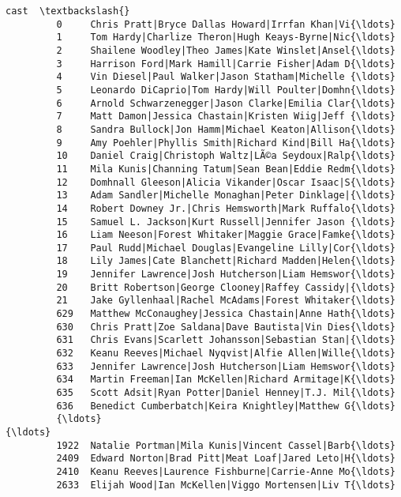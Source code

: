\documentclass[11pt]{article}
\begin{document}
\begin{Verbatim}[commandchars=\\\{\}]
                                                            cast  \textbackslash{}
         0     Chris Pratt|Bryce Dallas Howard|Irrfan Khan|Vi{\ldots}   
         1     Tom Hardy|Charlize Theron|Hugh Keays-Byrne|Nic{\ldots}   
         2     Shailene Woodley|Theo James|Kate Winslet|Ansel{\ldots}   
         3     Harrison Ford|Mark Hamill|Carrie Fisher|Adam D{\ldots}   
         4     Vin Diesel|Paul Walker|Jason Statham|Michelle {\ldots}   
         5     Leonardo DiCaprio|Tom Hardy|Will Poulter|Domhn{\ldots}   
         6     Arnold Schwarzenegger|Jason Clarke|Emilia Clar{\ldots}   
         7     Matt Damon|Jessica Chastain|Kristen Wiig|Jeff {\ldots}   
         8     Sandra Bullock|Jon Hamm|Michael Keaton|Allison{\ldots}   
         9     Amy Poehler|Phyllis Smith|Richard Kind|Bill Ha{\ldots}   
         10    Daniel Craig|Christoph Waltz|LÃ©a Seydoux|Ralp{\ldots}   
         11    Mila Kunis|Channing Tatum|Sean Bean|Eddie Redm{\ldots}   
         12    Domhnall Gleeson|Alicia Vikander|Oscar Isaac|S{\ldots}   
         13    Adam Sandler|Michelle Monaghan|Peter Dinklage|{\ldots}   
         14    Robert Downey Jr.|Chris Hemsworth|Mark Ruffalo{\ldots}   
         15    Samuel L. Jackson|Kurt Russell|Jennifer Jason {\ldots}   
         16    Liam Neeson|Forest Whitaker|Maggie Grace|Famke{\ldots}   
         17    Paul Rudd|Michael Douglas|Evangeline Lilly|Cor{\ldots}   
         18    Lily James|Cate Blanchett|Richard Madden|Helen{\ldots}   
         19    Jennifer Lawrence|Josh Hutcherson|Liam Hemswor{\ldots}   
         20    Britt Robertson|George Clooney|Raffey Cassidy|{\ldots}   
         21    Jake Gyllenhaal|Rachel McAdams|Forest Whitaker{\ldots}   
         629   Matthew McConaughey|Jessica Chastain|Anne Hath{\ldots}   
         630   Chris Pratt|Zoe Saldana|Dave Bautista|Vin Dies{\ldots}   
         631   Chris Evans|Scarlett Johansson|Sebastian Stan|{\ldots}   
         632   Keanu Reeves|Michael Nyqvist|Alfie Allen|Wille{\ldots}   
         633   Jennifer Lawrence|Josh Hutcherson|Liam Hemswor{\ldots}   
         634   Martin Freeman|Ian McKellen|Richard Armitage|K{\ldots}   
         635   Scott Adsit|Ryan Potter|Daniel Henney|T.J. Mil{\ldots}   
         636   Benedict Cumberbatch|Keira Knightley|Matthew G{\ldots}   
         {\ldots}                                                 {\ldots}   
         1922  Natalie Portman|Mila Kunis|Vincent Cassel|Barb{\ldots}   
         2409  Edward Norton|Brad Pitt|Meat Loaf|Jared Leto|H{\ldots}   
         2410  Keanu Reeves|Laurence Fishburne|Carrie-Anne Mo{\ldots}   
         2633  Elijah Wood|Ian McKellen|Viggo Mortensen|Liv T{\ldots}   

\end{Verbatim}
\end{document}
